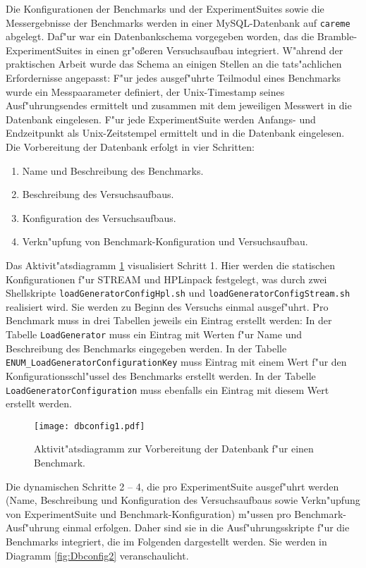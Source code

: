 Die Konfigurationen der Benchmarks und der ExperimentSuites sowie die Messergebnisse der Benchmarks werden in einer MySQL-Datenbank auf \texttt{careme} abgelegt. Daf"ur war ein Datenbankschema vorgegeben worden, das die Bramble-ExperimentSuites in einen gr"o\ss eren Versuchsaufbau integriert. W"ahrend der praktischen Arbeit wurde das Schema an einigen Stellen an die tats"achlichen Erfordernisse angepasst: F"ur jedes ausgef"uhrte Teilmodul eines Benchmarks wurde ein Messpaarameter definiert, der Unix-Timestamp seines Ausf"uhrungsendes ermittelt und zusammen mit dem jeweiligen Messwert in die Datenbank eingelesen. F"ur jede ExperimentSuite werden Anfangs- und Endzeitpunkt als Unix-Zeitstempel ermittelt und in die Datenbank eingelesen. Die Vorbereitung der Datenbank erfolgt in vier Schritten:  
\begin{enumerate}\bfseries
	\item Name und Beschreibung des Benchmarks. 
	\item Beschreibung des Versuchsaufbaus. 
	\item Konfiguration des Versuchsaufbaus. 
	\item Verkn"upfung von Benchmark-Konfiguration und Versuchsaufbau.
\end{enumerate} 
Das Aktivit"atsdiagramm \ref{fig:Dbconfig1} visualisiert Schritt 1. Hier werden die statischen Konfigurationen f"ur STREAM und HPLinpack festgelegt, was durch zwei Shellskripte \texttt{loadGeneratorCon\-figHpl.sh} und \texttt{loadGenerator\-ConfigStream.sh} realisiert wird. Sie werden zu Beginn des Versuchs einmal ausgef"uhrt. Pro Benchmark muss in drei Tabellen jeweils ein Eintrag erstellt werden: In der Tabelle \texttt{LoadGenerator} muss ein Eintrag mit Werten f"ur Name und Beschreibung des Benchmarks eingegeben werden. In der Tabelle \texttt{ENUM\_LoadGeneratorConfigura\-tionKey} muss Eintrag mit einem Wert f"ur den Konfigurationsschl"ussel des Benchmarks erstellt werden. In der Tabelle \texttt{LoadGeneratorConfiguration} muss ebenfalls ein Eintrag mit diesem Wert erstellt werden.
\begin{figure}[htb]
\centering
\texttt{[image: dbconfig1.pdf]}
\caption{Aktivit"atsdiagramm zur Vorbereitung der Datenbank f"ur einen Benchmark.}
\label{fig:Dbconfig1}
\end{figure}
Die dynamischen Schritte 2 -- 4, die pro ExperimentSuite ausgef"uhrt werden (Name, Beschreibung und Konfiguration des Versuchsaufbaus sowie Verkn"upfung von ExperimentSuite und Benchmark-Konfiguration) m"ussen pro Benchmark-Ausf"uhrung einmal erfolgen. Daher sind sie in die Ausf"uhrungsskripte f"ur die Benchmarks integriert, die im Folgenden dargestellt werden. Sie werden in Diagramm \ref{fig:Dbconfig2} veranschaulicht. 

